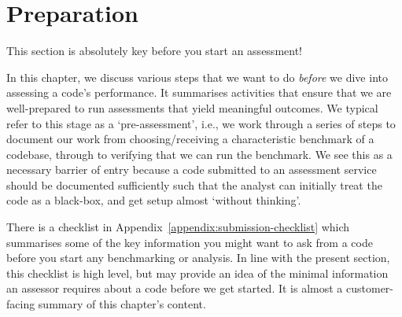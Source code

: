 \chapter{Preparation}
\label{chapter:preparation}

\begin{readerguide}
 This section is absolutely key before you start an assessment! 
\end{readerguide}


In this chapter, we discuss various steps that we want to do \emph{before} we dive into assessing a code's performance.
It summarises activities that ensure that we are well-prepared to run assessments that yield meaningful outcomes. 
We typical refer to this stage as a `pre-assessment', i.e., we work through a series of steps to document our work from choosing/receiving a characteristic benchmark of a codebase, through to verifying that we can run the benchmark. 
We see this as a necessary barrier of entry because a code submitted to an assessment service should be documented sufficiently such that the analyst can initially treat the code as a black-box, and get setup almost `without thinking'.


There is a checklist in Appendix~\ref{appendix:submission-checklist} which summarises some of the key information you might want to ask from a code before you start any benchmarking or analysis.
In line with the present section, this checklist is high level, but may provide an idea of the minimal information an assessor requires about a code before we get started.
It is almost a customer-facing summary of this chapter's content. 
